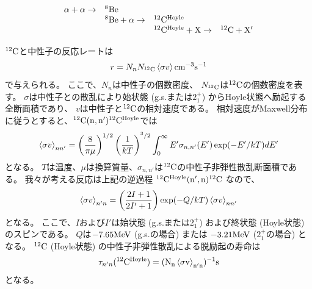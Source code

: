 \begin{equation}
  \begin{array}{llll}
    \alpha + \alpha \rightarrow & {}^{8}\rm{Be} & &\\
    & {}^{8}\rm{Be} + \alpha \rightarrow & {}^{12}\rm{C}^{Hoyle} &\\
    & & {}^{12}\rm{C}^{Hoyle} + \rm{X} \rightarrow & {}^{12}\rm{C} + \rm{X'}
  \end{array}\label{eq::triplealpha_particle}
\end{equation}

${}^{12}\rm{C}$と中性子の反応レートは
\begin{equation}
  r = N_{n}N_{{}^{12}\rm{C}}\braket{\sigma v} \rm{cm}^{-3}\rm{s}^{-1}
  \label{eq::r}
\end{equation}
で与えられる。
ここで、$N_{n}$は中性子の個数密度、
$N_{{}^{12}\rm{C}}$は${}^{12}\rm{C}$の個数密度を表す。
$\sigma$は中性子との散乱により始状態 (g.s.または$2_{1}^{+}$) からHoyle状態へ励起する全断面積であり、
$v$は中性子と${}^{12}\rm{C}$の相対速度である。
相対速度がMaxwell分布に従うとすると、${}^{12}\rm{C}(n,n'){}^{12}\rm{C}^{\rm{Hoyle}}$では
\begin{equation}
  \braket{\sigma v}_{nn'} =
  \left(\frac{8}{\pi\mu}\right)^{1/2}\left(\frac{1}{kT}\right)^{^3/2}
  \int^{\infty}_{0}E'\sigma_{n,n'}(E')\exp(-E'/kT)dE'
  \label{eq::sigmann'}
\end{equation}
となる。
$T$は温度、$\mu$は換算質量、$\sigma_{n,n'}$は${}^{12}\rm{C}$の中性子非弾性散乱断面積である。
我々が考える反応は上記の逆過程 ${}^{12}\rm{C}^{\rm{Hoyle}}(n',n){}^{12}\rm{C}$ なので、
\begin{equation}
  \braket{\sigma v}_{n'n} = \left(\frac{2I+1}{2I'+1}\right)
  \exp(-Q/kT)\braket{\sigma v}_{nn'}
  \label{eq::sigman'n}
\end{equation}
となる。
ここで、$I$および$I'$は始状態 (g.s.または$2_{1}^{+}$)
および終状態 (Hoyle状態) のスピンである。
$Q$は$-7.65\rm{MeV}$ (g.s.の場合) または
$-3.21\rm{MeV}$ ($2_{1}^{+}$の場合) となる。
${}^{12}\rm{C}$ (Hoyle状態) の中性子非弾性散乱による脱励起の寿命は
\begin{equation}
  \tau_{n'n}({}^{12}\rm{C}^{\rm{Hoyle}}) =
  (N_{n}\braket{\sigma v}_{n'n})^{-1} \rm{s}
  \label{eq::tau}
\end{equation}
となる。

